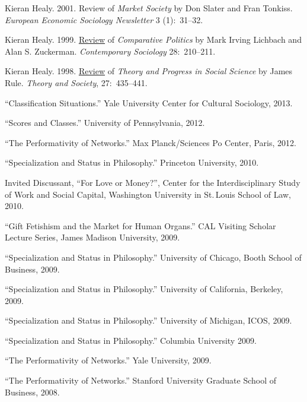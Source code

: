 \documentclass[11pt,article,oneside]{memoir}
\begin{document}
\ind  Kieran Healy. 2001. Review of \emph{Market Society} by Don Slater and Fran Tonkiss. \emph{European Economic Sociology Newsletter} 3 (1):~31--32.


\ind  Kieran Healy. 1999. \href{http://links.jstor.org/sici?sici=0094-3061%28199903%2928%3A2%3C210%3ACPRCAS%3E2.0.CO%3B2-C}{Review} of \emph{Comparative Politics} by Mark Irving Lichbach and Alan S.
Zuckerman. \emph{Contemporary Sociology} 28:~210--211.


\ind  Kieran Healy. 1998. \href{http://www.kieranhealy.org/files/reviews/rule.pdf}{Review} of \emph{Theory and Progress in Social Science} by James Rule.  \emph{Theory
  and Society}, 27:~435--441.

 
 \bigskip

\medskip


\ind ``Classification Situations.'' Yale University Center for Cultural Sociology, 2013.
 
\ind ``Scores and Classes.'' University of Pennsylvania, 2012.

\ind ``The Performativity of Networks.'' Max Planck/Sciences Po Center, Paris, 2012. 
 
\ind ``Specialization and Status in Philosophy.'' Princeton University, 2010. 

\ind Invited Discussant, ``For Love or Money?'', Center for the Interdisciplinary Study of Work and Social Capital, Washington University in St.\,Louis School of Law, 2010. 

\ind ``Gift Fetishism and the Market for Human Organs.'' CAL Visiting Scholar Lecture Series, James Madison University, 2009. 

\ind ``Specialization and Status in Philosophy.'' University of Chicago, Booth School of Business, 2009. 

\ind ``Specialization and Status in Philosophy.'' University of California, Berkeley, 2009. 

\ind ``Specialization and Status in Philosophy.'' University of Michigan, ICOS, 2009. 

\ind ``Specialization and Status in Philosophy.'' Columbia University 2009. 

\ind ``The Performativity of Networks.'' Yale University, 2009. 

\ind ``The Performativity of Networks.'' Stanford University Graduate School of Business, 2008. 
\end{document}
